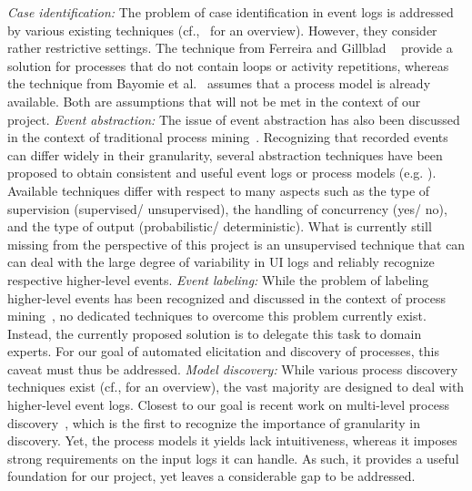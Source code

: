 \vspace{0.2em}
\newline%
\noindent \textit{Case identification:}  The problem of case identification in event logs is addressed by various existing techniques (cf.,~\cite{diba2020extraction} for an overview). However, they consider rather restrictive settings. The technique from Ferreira and Gillblad ~\cite{ferreira2009discovering} provide a solution for processes that do not contain loops or activity repetitions, whereas the technique from Bayomie et al.~\cite{bayomie2019probabilistic} assumes that a process model is already available. Both are assumptions that will not be met in the context of our project. 
\vspace{0.2em}
\newline%
\noindent \textit{Event abstraction:} 
The issue of event abstraction has also been discussed in the context of traditional process mining~\cite{van2020event,diba2020extraction}. Recognizing that recorded events can differ widely in their granularity, several abstraction techniques have been proposed to obtain consistent and useful event logs or process models (e.g. \cite{baier2014bridging,van2020event,de2020event}). Available techniques differ with respect to many aspects such as the type of supervision (supervised/ unsupervised), the handling of concurrency (yes/ no), and the type of output (probabilistic/ deterministic). What is currently still missing from the perspective of this project is an unsupervised technique that can can deal with the large degree of variability in UI logs and reliably recognize respective higher-level events. 
\vspace{0.2em}
\newline%
\noindent \textit{Event labeling:} 
While the problem of labeling higher-level events has been recognized and discussed in the context of process mining~\cite{van2020event,van2016enabling}, no dedicated techniques to overcome this problem currently exist. Instead, the  currently proposed solution is to delegate this task to domain experts. For our goal of automated elicitation and discovery of processes, this caveat must thus be addressed.   
\vspace{0.2em}
\newline%
\noindent \textit{Model discovery:} 
While various process discovery techniques exist (cf., \cite{augusto2018automated} for an overview), the vast majority are designed to deal with higher-level event logs. Closest to our goal is recent work on multi-level process discovery~\cite{leemans2020using}, which is the first to recognize the importance of granularity in discovery. Yet, the process models it yields lack intuitiveness, whereas it imposes strong requirements on the input logs it can handle. As such, it provides a useful foundation for our project, yet leaves a considerable gap to be addressed.

